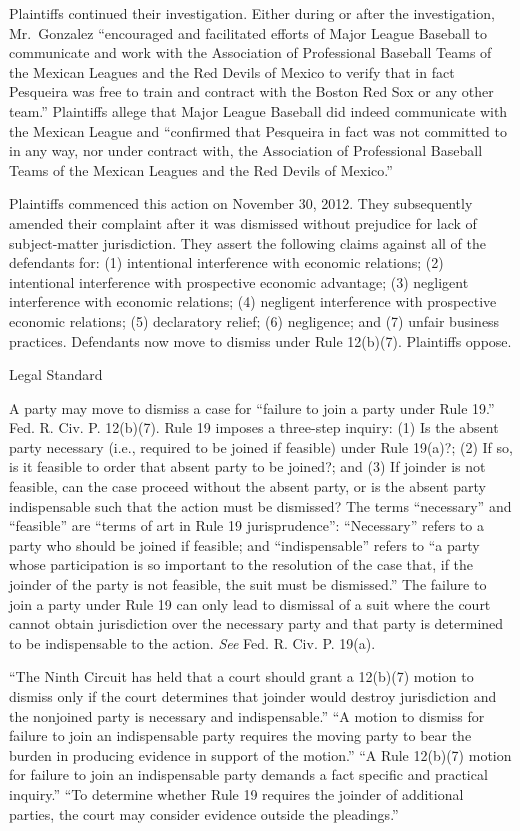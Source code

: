 \documentclass[11pt,letterpaper,twoside]{article}
\begin{document}
Plaintiffs continued their investigation. Either during or after the
investigation, Mr.~Gonzalez ``encouraged and facilitated efforts of
Major League Baseball to communicate and work with the Association of
Professional Baseball Teams of the Mexican Leagues and the Red Devils of
Mexico to verify that in fact Pesqueira was free to train and contract
with the Boston Red Sox or any other team.'' Plaintiffs allege that
Major League Baseball did indeed communicate with the Mexican League and
``confirmed that Pesqueira in fact was not committed to in any way, nor
under contract with, the Association of Professional Baseball Teams of
the Mexican Leagues and the Red Devils of Mexico.''

Plaintiffs commenced this action on November 30, 2012. They subsequently
amended their complaint after it was dismissed without prejudice for
lack of subject-matter jurisdiction. They assert the following claims
against all of the defendants for: (1) intentional interference with
economic relations; (2) intentional interference with prospective
economic advantage; (3) negligent interference with economic relations;
(4) negligent interference with prospective economic relations; (5)
declaratory relief; (6) negligence; and (7) unfair business practices.
Defendants now move to dismiss under Rule 12(b)(7). Plaintiffs oppose.

{Legal Standard}

A party may move to dismiss a case for ``failure to join a party under
Rule 19.'' Fed. R. Civ. P. 12(b)(7). Rule 19 imposes a three-step
inquiry: (1) Is the absent party necessary (i.e., required to be joined
if feasible) under Rule 19(a)?; (2) If so, is it feasible to order that
absent party to be joined?; and (3) If joinder is not feasible, can the
case proceed without the absent party, or is the absent party
indispensable such that the action must be dismissed? The terms
``necessary'' and ``feasible'' are ``terms of art in Rule 19
jurisprudence'': ``Necessary'' refers to a party who should be joined if
feasible; and ``indispensable'' refers to ``a party whose participation
is so important to the resolution of the case that, if the joinder of
the party is not feasible, the suit must be dismissed.'' The failure to
join a party under Rule 19 can only lead to dismissal of a suit where
the court cannot obtain jurisdiction over the necessary party and that
party is determined to be indispensable to the action. \emph{See} Fed.
R. Civ. P. 19(a).

``The Ninth Circuit has held that a court should grant a 12(b)(7) motion
to dismiss only if the court determines that joinder would destroy
jurisdiction and the nonjoined party is necessary and indispensable.''
``A motion to dismiss for failure to join an indispensable party
requires the moving party to bear the burden in producing evidence in
support of the motion.'' ``A Rule 12(b)(7) motion for failure to join an
indispensable party demands a fact specific and practical inquiry.''
``To determine whether Rule 19 requires the joinder of additional
parties, the court may consider evidence outside the pleadings.''
\end{document}
